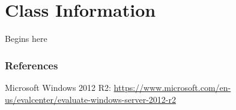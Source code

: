 \documentclass[UTF8]{beamer}
\begin{document}
\section{Class Information}
\frame{\tableofcontents[currentsection]}

	\begin{frame}
	Begins here
	\end{frame}


\begin{frame}[allowframebreaks]
\frametitle{References}
\begin{thebibliography}{9}
Microsoft Windows 2012 R2: \url{https://www.microsoft.com/en-us/evalcenter/evaluate-windows-server-2012-r2}
\end{thebibliography}
\end{frame}
\end{document}

